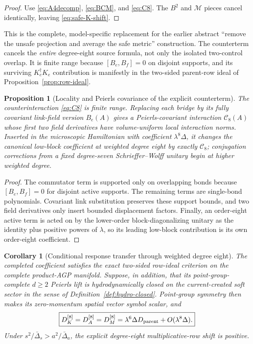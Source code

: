 \documentclass[11pt]{article}
\newtheorem{proposition}[theorem]{Proposition}
\newtheorem{corollary}[theorem]{Corollary}
\theoremstyle{definition}
\theoremstyle{remark}
\newcommand{\cC}{\mathcal C}
\newcommand{\cM}{\mathcal M}
\begin{document}
\begin{proof}
Use \eqref{eq:A4decomp}, \eqref{eq:BCM}, and \eqref{eq:C8}.  The $B^2$ and $\cM$ pieces cancel identically, leaving \eqref{eq:safe-K-shift}.
\end{proof}

This is the complete, model-specific replacement for the earlier abstract
``remove the unsafe projection and average the safe metric'' construction.
The counterterm cancels the \emph{entire} degree-eight source formula, not only
the isolated two-control overlap.  It is finite range because
$[B_e,B_f]=0$ on disjoint supports, and its surviving
$K_e^\dagger K_e$ contribution is manifestly in the two-sided parent-row
ideal of Proposition~\ref{prop:row-ideal}.

\begin{proposition}[Locality and Peierls covariance of the explicit counterterm]
\label{prop:C8-locality}
The counterinteraction \eqref{eq:C8} is finite range.  Replacing each bridge by
its fully covariant link-field version $B_e(A)$ gives a Peierls-covariant
interaction $\cC_8(A)$ whose first two field derivatives have volume-uniform
local interaction norms.  Inserted in the microscopic Hamiltonian with
coefficient $\lambda^8\Delta$, it changes the canonical low-block coefficient
at weighted degree eight by exactly $\cC_8$; conjugation corrections from a
fixed degree-seven Schrieffer--Wolff unitary begin at higher weighted degree.
\end{proposition}

\begin{proof}
The commutator term is supported only on overlapping bonds because
$[B_e,B_f]=0$ for disjoint active supports.  The remaining terms are single-bond
polynomials.  Covariant link substitution preserves these support bounds, and
two field derivatives only insert bounded displacement factors.  Finally, an
order-eight active term is acted on by the lower-order block-diagonalizing
unitary as the identity plus positive powers of $\lambda$, so its leading
low-block contribution is its own order-eight coefficient.
\end{proof}

\begin{corollary}[Conditional response transfer through weighted degree eight]
\label{cor:degree8-transfer}
The completed coefficient satisfies the exact two-sided row-ideal criterion on
the complete product-AGP manifold.  Suppose, in addition, that its
point-group-complete $d\ge2$ Peierls lift is hydrodynamically closed on the
current-created soft sector in the sense of Definition~\ref{def:hydro-closed}.  Point-group
symmetry then makes its zero-momentum spatial vector symbol scalar, and
\begin{equation}
 \boxed{
 D_K^{[8]}=D_A^{[8]}=D_M^{[8]}
 =\lambda^6\Delta D_{\rm parent}+O(\lambda^8\Delta).}
 \label{eq:degree8-completed-transfer}
\end{equation}
Under $s^2/\bar\Delta_s>a^2/\bar\Delta_a$, the explicit degree-eight
multiplicative-row shift is positive.
\end{corollary}
\end{document}
